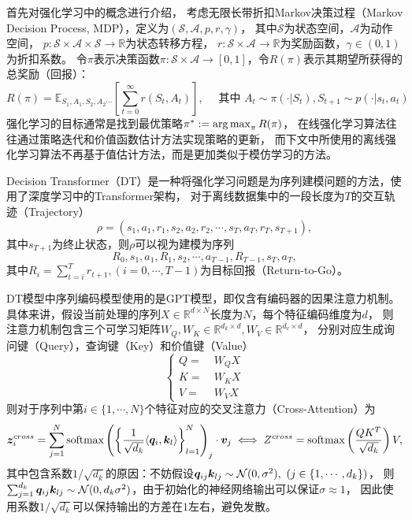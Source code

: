 首先对强化学习中的概念进行介绍，
考虑无限长带折扣Markov决策过程（Markov Decision Process, MDP），定义为$(\mathcal{S},\mathcal{A},p,r,\gamma)$，
其中$\mathcal{S}$为状态空间，$\mathcal{A}$为动作空间，
$p:\mathcal{S}\times \mathcal{A}\times \mathcal{S}\to \mathbb{R}$为状态转移方程，
$r:\mathcal{S}\times\mathcal{A}\to \mathbb{R}$为奖励函数，$\gamma\in(0,1)$为折扣系数。
令$\pi$表示决策函数$\pi: \mathcal{S}\times \mathcal{A}\to [0,1]$，令$R(\pi)$表示其期望所获得的总奖励（回报）：
\begin{equation}
  R(\pi) = \mathbb{E}_{S_1,A_1,S_2,A_2\cdots}\left[\sum_{t=0}^{\infty}r(S_t,A_t)\right],\quad
  \text{~其中~}A_t\sim\pi(\cdot|S_t),S_{t+1}\sim p(\cdot|s_t,a_t)
\end{equation}
强化学习的目标通常是找到最优策略$\pi^* := \operatorname*{arg\,max}_{\pi}R(\pi)$，
在线强化学习算法往往通过策略迭代和价值函数估计方法实现策略的更新，
而下文中所使用的离线强化学习算法不再基于值估计方法，而是更加类似于模仿学习的方法。

Decision Transformer（DT）是一种将强化学习问题是为序列建模问题的方法，使用了深度学习中的Transformer架构，
对于离线数据集中的一段长度为$T$的交互轨迹（Trajectory）
\begin{equation}
  \rho = (s_1,a_1,r_1,s_2,a_2,r_2,\cdots,s_T,a_T,r_T,s_{T+1}),
\end{equation}
其中$s_{T+1}$为终止状态，则$\rho$可以视为建模为序列
\begin{equation}\label{eq-sequence}
  R_0,s_1,a_1,R_1,s_2,\cdots,a_{T-1},R_{T-1},s_{T},a_{T},
\end{equation}
其中$R_i=\sum_{t=i}^Tr_{t+1}, (i=0,\cdots,T-1)$为目标回报（Return-to-Go）。

DT模型中序列编码模型使用的是GPT模型，即仅含有编码器的因果注意力机制。
具体来讲，假设当前处理的序列$X\in\mathbb{R}^{d\times N}$长度为$N$，每个特征编码维度为$d$，
则注意力机制包含三个可学习矩阵$W_{Q},W_{K}\in\mathbb{R}^{d_k\times d}, W_{V}\in\mathbb{R}^{d_v\times d}$，
分别对应生成询问键（Query），查询键（Key）和价值键（Value）
\begin{equation}
  \left\{
  \begin{aligned}
  Q=&\ W_{Q}X\\ K=&\ W_{K}X\\ V=&\ W_{V}X
  \end{aligned}
  \right.
\end{equation}
则对于序列中第$i\in\{1,\cdots,N\}$个特征对应的交叉注意力（Cross-Attention）为
\begin{equation}
  \boldsymbol{z}^{cross}_i = \sum_{j=1}^N\text{softmax}\left(\left\{\frac{1}{\sqrt{d_k}}\langle \boldsymbol{q}_i,\boldsymbol{k}_l\rangle\right\}_{l=1}^N\right)_j\cdot \boldsymbol{v}_j\iff
  Z^{cross} = \text{softmax}\left(\frac{QK^T}{\sqrt{d_k}}\right)V,
\end{equation}
其中包含系数$1/\sqrt{d_k}$的原因：不妨假设$\boldsymbol{q}_{ij}\boldsymbol{k}_{lj}\sim \mathcal{N}(0,\sigma^2),~(j\in\{1,\cdots,d_k\})$，
则$\sum_{j=1}^{d_k}\boldsymbol{q}_{ij}\boldsymbol{k}_{lj}\sim\mathcal{N}(0,d_k\sigma^2)$，由于初始化的神经网络输出可以保证$\sigma\approx 1$，
因此使用系数$1/\sqrt{d_k}$可以保持输出的方差在$1$左右，避免发散。

